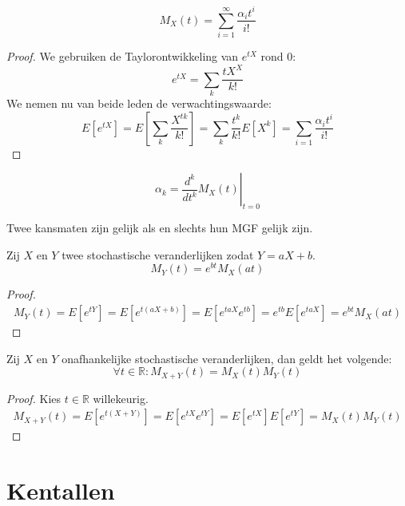 \documentclass[main.tex]{subfiles}
\begin{document}
\begin{st}
  \[ M_{X}(t) = \sum_{i=1}^{\infty} \frac{\alpha_{i}t^{i}}{i!} \]

  \begin{proof}
    We gebruiken de Taylorontwikkeling van $e^{tX}$ rond $0$:
    \[ e^{tX} = \sum_{k}\frac{tX^{X}}{k!} \]
    We nemen nu van beide leden de verwachtingswaarde:
    \[
    E\left[e^{tX}\right]
    = E\left[\sum_{k}\frac{X^{tk}}{k!}\right]
    = \sum_{k}\frac{t^{k}}{k!}E\left[X^{k}\right]
    = \sum_{i=1} \frac{\alpha_{i}t^{i}}{i!}
    \]
  \end{proof}
\end{st}

\begin{gev}
  \[ \alpha_{k} = \left. \frac{d^{k}}{dt^{k}}M_{X}(t) \right|_{t=0} \]
\end{gev}

\begin{st}
  Twee kansmaten zijn gelijk als en slechts hun MGF gelijk zijn.
\end{st}

\begin{st}
  Zij $X$ en $Y$ twee stochastische veranderlijken zodat $Y=aX+b$.
  \[ M_{Y}(t) = e^{bt}M_{X}(at) \]

  \begin{proof}
    \begin{align*}
      M_{Y}(t) = E\left[e^{tY}\right] = E\left[e^{t(aX+b)}\right] = E\left[e^{taX}e^{tb}\right] = e^{tb}E\left[e^{taX}\right] = e^{bt}M_{X}(at)
    \end{align*}
  \end{proof}
\end{st}

\begin{ei}
  Zij $X$ en $Y$ onafhankelijke stochastische veranderlijken, dan geldt het volgende:
  \[ \forall t\in\mathbb{R}: M_{X+Y}(t) = M_{X}(t)M_{Y}(t) \]

  \begin{proof}
    Kies $t\in\mathbb{R}$ willekeurig.
    \begin{align*}
      M_{X+Y}(t) = E\left[e^{t(X+Y)}\right] = E\left[e^{tX}e^{tY}\right] = E\left[e^{tX}\right]E\left[e^{tY}\right] = M_{X}(t)M_{Y}(t)
    \end{align*}
  \end{proof}
\end{ei}


\section{Kentallen}
\label{sec:kentallen}
\end{document}
